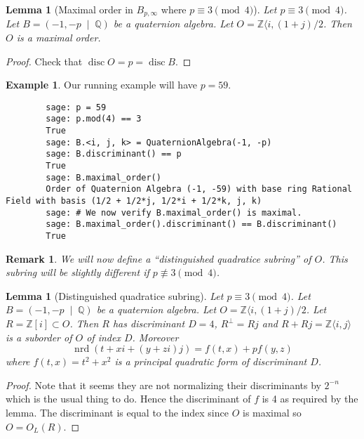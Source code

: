 \documentclass[10pt]{article}
\theoremstyle{plain}
\newtheorem{lemma}[theorem]{Lemma}
\newtheorem{remark}[theorem]{Remark}
\theoremstyle{definition}
\newtheorem{example}[theorem]{Example}
\newcommand{\op}{\operatorname}
\newcommand{\Z}{\mathbb{Z}}
\newcommand{\Q}{\mathbb{Q}}
\newcommand{\nrd}{\op{nrd}}
\newcommand{\disc}{\op{disc}}
\begin{document}
\begin{lemma}[Maximal order in \( B_{p, \infty} \) where \( p \equiv 3 \pmod{4} \)]
    Let \( p \equiv 3 \pmod{4} \).
    Let \( B =  (-1, -p \; \mid \; \Q) \) be a quaternion algebra.
    Let \( O = \Z \langle i, (1+j) / 2 \).
    Then \( O \) is a maximal order.
\end{lemma}
\begin{proof}
    Check that \( \disc O  = p = \disc B\).
\end{proof}

\begin{example}
    Our running example will have \( p = 59 \).
    \begin{lstlisting}
        sage: p = 59
        sage: p.mod(4) == 3
        True 
        sage: B.<i, j, k> = QuaternionAlgebra(-1, -p)
        sage: B.discriminant() == p
        True
        sage: B.maximal_order()
        Order of Quaternion Algebra (-1, -59) with base ring Rational Field with basis (1/2 + 1/2*j, 1/2*i + 1/2*k, j, k)
        sage: # We now verify B.maximal_order() is maximal.
        sage: B.maximal_order().discriminant() == B.discriminant()
        True
    \end{lstlisting}
\end{example}

\begin{remark}
    We will now define a ``distinguished quadratice subring'' of \( O \).
    This subring will be slightly different if \( p \not\equiv 3 \pmod{4} \).
\end{remark}

\begin{lemma}[Distinguished quadratice subring]
    Let \( p \equiv 3 \pmod{4} \).
    Let \( B =  (-1, -p \; \mid \; \Q) \) be a quaternion algebra.
    Let \( O = \Z \langle i, (1+j) / 2 \).
    Let \( R = \Z[i] \subset O \).
    Then \( R \) has discriminant \( D = 4 \), \( R^\perp = Rj \) and \( R + Rj = \Z\langle i, j \rangle\) is a suborder of \( O \) of index \( D \).
    Moreover
    \[
        \nrd(t + xi + (y + zi)j) = f(t, x) + p f(y, z)
    \]
    where \( f(t, x) = t^2 + x^2 \) is a principal quadratic form of discriminant \( D \).
\end{lemma}
\begin{proof}
    Note that it seems they are not normalizing their discriminants by \( 2^{-n} \) which is the usual thing to do.
    Hence the discriminant of \( f \) is 4 as required by the lemma.
    The discriminant is equal to the index since \( O \) is maximal so \( O = O_L(R) \).
\end{proof}
\end{document}
